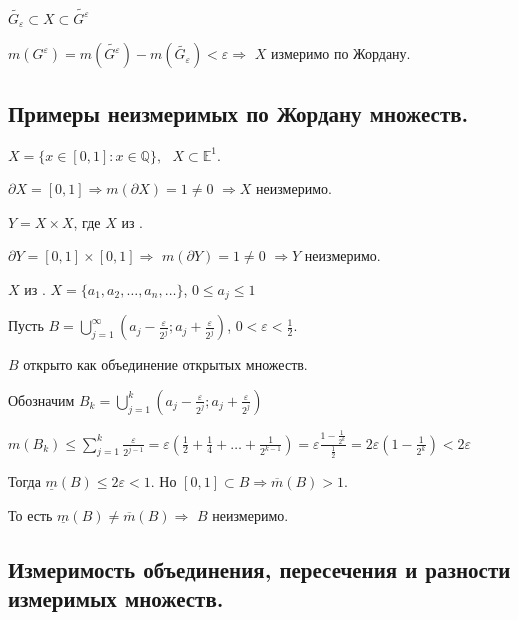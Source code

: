 \documentclass[a4paper,12pt]{article} %
\begin{document}
	
	$\widetilde{G_{\varepsilon}} \subset X \subset \widetilde{G^{\varepsilon}}$
	
	$m(G^{\varepsilon}) = m(\widetilde{G^{\varepsilon}}) - m(\widetilde{G_{\varepsilon}}) < \varepsilon \Rightarrow$ $X$ измеримо по Жордану.\\
	
	\subsection{Примеры неизмеримых по Жордану множеств.}
	
	 $X = \{x \in [0, 1]: x \in \mathbb{Q}\}, \text{ }X \subset \mathbb{E}^1$.
	
	$\partial X = [0,1] \Rightarrow m(\partial X) = 1 \neq 0$ $\Rightarrow X$ неизмеримо.
	
	\vspace{5mm}
	 $Y = X\times X$, где $X$ из .
	
	$\partial Y = [0,1]\times [0,1] \Rightarrow$ $m(\partial Y) = 1 \neq 0$ $\Rightarrow Y$ неизмеримо.
	
	\vspace{5mm}
	 $X$ из . $X = \{a_1, a_2, \ldots, a_n, \ldots\}$, $0 \leqslant a_j \leqslant 1$
	
	Пусть $B = \bigcup\limits_{j = 1}^{\infty} \left(a_j - \frac{\varepsilon}{2^j}; a_j + \frac{\varepsilon}{2^j}\right)$, $0 < \varepsilon < \frac{1}{2}$.
	
	$B$ открыто как объединение открытых множеств.
	
	Обозначим $B_k = \bigcup\limits_{j = 1}^k \left(a_j - \frac{\varepsilon}{2^j}; a_j + \frac{\varepsilon}{2^j}\right)$
	
	
	$m(B_k) \leqslant \sum\limits_{j = 1}^k \frac{\varepsilon}{2^{j-1}} = \varepsilon \left(\frac{1}{2} + \frac{1}{4} + \ldots + \frac{1}{2^{k-1}}\right) = \varepsilon \frac{1 - \frac{1}{2^k}}{\frac{1}{2}} = 2\varepsilon \left(1 - \frac{1}{2^k}\right) < 2\varepsilon$
	
	Тогда $\underline{m}(B) \leqslant 2\varepsilon < 1$. Но $[0, 1]\subset B \Rightarrow \overline{m}(B) > 1$.
	
	То есть $\underline{m}(B) \neq \overline{m}(B) \Rightarrow$  $B$ неизмеримо.\\
	
	\subsection{Измеримость объединения, пересечения и разности измеримых множеств.}
	
\end{document}
